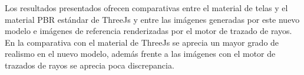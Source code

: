 Los resultados presentados ofrecen comparativas entre el material de telas y el material PBR est\'andar de ThreeJs
y entre las im\'agenes generadas por este nuevo modelo e im\'agenes de referencia renderizadas por el motor de
trazado de rayos. En la comparativa con el material de ThreeJs se aprecia un mayor grado de realismo en el nuevo modelo, adem\'as
frente a las im\'agenes con el motor de trazados de rayos se aprecia poca discrepancia.












